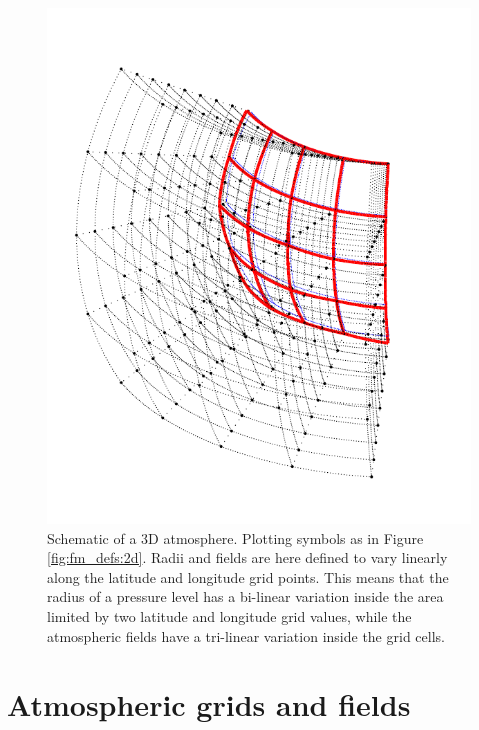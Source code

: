 \begin{figure}[t]
 \begin{center}
  \includegraphics*[angle=-90,width=0.98\hsize]{atm_dim_3d}
  \vspace*{-15mm}
  \caption{Schematic of a 3D atmosphere. Plotting symbols as in 
    Figure \ref{fig:fm_defs:2d}. Radii and fields are here defined to
    vary linearly along the latitude and longitude grid points. This
    means that the radius of a pressure level has a
    bi-linear variation inside the area limited by two latitude and
    longitude grid values, while the atmospheric fields have a
    tri-linear variation inside the grid cells. }
  \label{fig:fm_defs:3d}
 \end{center}
\end{figure}



\section{Atmospheric grids and fields}
\label{sec:fm_defs:grids}

